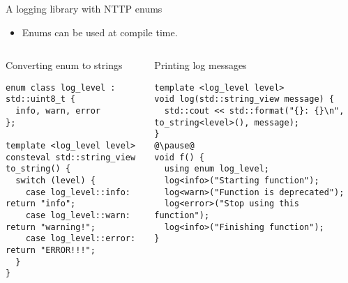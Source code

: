 \begin{frame}[t,fragile]{A logging library with NTTP enums}
\begin{itemize}
  \item Enums can be used at compile time.
\end{itemize}

\begin{columns}[T]

\begin{block}{Converting enum to strings}
\begin{lstlisting}
enum class log_level : std::uint8_t {
  info, warn, error
};

template <log_level level>
consteval std::string_view to_string() {
  switch (level) {
    case log_level::info: return "info";
    case log_level::warn: return "warning!";
    case log_level::error: return "ERROR!!!";
  }
}
\end{lstlisting}
\end{block}

\pause
{}
\begin{block}{Printing log messages}
\begin{lstlisting}[escapechar=@]
template <log_level level>
void log(std::string_view message) {
  std::cout << std::format("{}: {}\n", to_string<level>(), message);
}
@\pause@
void f() {
  using enum log_level;
  log<info>("Starting function");
  log<warn>("Function is deprecated");
  log<error>("Stop using this function");
  log<info>("Finishing function");
}
\end{lstlisting}
\end{block}

\end{columns}

\end{frame}


